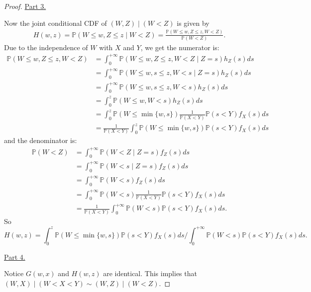 \documentclass[stat_333_lecture_notes.tex]{subfiles}
\begin{document}
\begin{proof}
    \noindent \underline{Part 3.}

    Now the joint conditional CDF of \((W,Z) \mid (W<Z)\) is given by
    \begin{align*}
        H(w,z) = \mathbb{P}(W \leq w, Z \leq z \mid W<Z) = \frac{\mathbb{P}(W \leq w, Z \leq z, W<Z)}{\mathbb{P}(W<Z)}.
    \end{align*}
    Due to the independence of \(W\) with \(X\) and \(Y\),
    we get the numerator is:
    \begin{align*}
        \mathbb{P}(W \leq w, Z \leq z, W<Z) & = \int_{0}^{+\infty}\mathbb{P}(W \leq w, Z \leq z, W<Z \mid Z=s)h_{Z}(s)ds                     \\
                                            & = \int_{0}^{+\infty}\mathbb{P}(W \leq w, s \leq z, W<s \mid Z=s)h_{Z}(s)ds                     \\
                                            & = \int_{0}^{+\infty}\mathbb{P}(W \leq w, s \leq z, W<s)h_{Z}(s)ds                              \\
                                            & = \int_{0}^{z}\mathbb{P}(W \leq w, W<s)h_{Z}(s)ds                                              \\
                                            & = \int_{0}^{z}\mathbb{P}(W \leq \min\{w,s\})\frac{1}{\mathbb{P}(X<Y)}\mathbb{P}(s<Y)f_{X}(s)ds \\
                                            & = \frac{1}{\mathbb{P}(X<Y)}\int_{0}^{z}\mathbb{P}(W \leq \min\{w,s\})\mathbb{P}(s<Y)f_{X}(s)ds
    \end{align*}
    and the denominator is:
    \begin{align*}
        \mathbb{P}(W<Z) & = \int_{0}^{+\infty}\mathbb{P}(W<Z \mid Z=s)f_{Z}(s)ds                                 \\
                        & = \int_{0}^{+\infty}\mathbb{P}(W<s \mid Z=s)f_{Z}(s)ds                                 \\
                        & = \int_{0}^{+\infty}\mathbb{P}(W<s)f_{Z}(s)ds                                          \\
                        & = \int_{0}^{+\infty}\mathbb{P}(W<s)\frac{1}{\mathbb{P}(X<Y)}\mathbb{P}(s<Y)f_{X}(s)ds  \\
                        & = \frac{1}{\mathbb{P}(X<Y)}\int_{0}^{+\infty}\mathbb{P}(W<s)\mathbb{P}(s<Y)f_{X}(s)ds.
    \end{align*}
    So
    \[H(w,z) = \int_{0}^{z}\mathbb{P}(W \leq \min\{w,s\})\mathbb{P}(s<Y)f_{X}(s)ds \bigg/ \int_{0}^{+\infty}\mathbb{P}(W<s)\mathbb{P}(s<Y)f_{X}(s)ds.\]

    \noindent \underline{Part 4.}

    Notice \(G(w,x)\) and \(H(w,z)\) are identical.
    This implies that \((W,X) \mid (W<X<Y) \sim (W,Z) \mid (W<Z)\).
\end{proof}

\newpage
\end{document}

